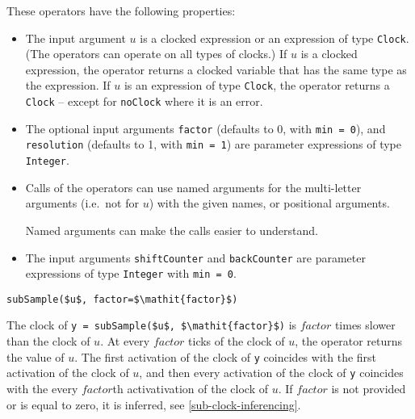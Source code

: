 These operators have the following properties:
\begin{itemize}
\item
  The input argument $u$ is a clocked expression or an expression of type \lstinline!Clock!.  (The operators can operate on all types of clocks.)  If $u$ is a clocked expression, the operator returns a clocked variable that has the same type as the expression.  If $u$ is an expression of type \lstinline!Clock!, the operator returns a \lstinline!Clock! -- except for \lstinline!noClock! where it is an error.
\item
  The optional input arguments \lstinline!factor! (defaults to 0, with \lstinline!min = 0!), and \lstinline!resolution! (defaults to 1, with \lstinline!min = 1!) are parameter expressions of type \lstinline!Integer!.
\item
  Calls of the operators can use named arguments for the multi-letter arguments (i.e.\ not for $u$) with the given names, or positional arguments.
\begin{nonnormative}
Named arguments can make the calls easier to understand.
\end{nonnormative}
\item
  The input arguments \lstinline!shiftCounter! and \lstinline!backCounter! are parameter expressions of type \lstinline!Integer! with \lstinline!min = 0!.
\end{itemize}

\begin{operatordefinition}[subSample]
\begin{synopsis}\begin{lstlisting}
subSample($u$, factor=$\mathit{factor}$)
\end{lstlisting}\end{synopsis}
\begin{semantics}
The clock of \lstinline!y = subSample($u$, $\mathit{factor}$)! is $\mathit{factor}$ times slower than the clock of $u$.
At every $\mathit{factor}$ ticks of the clock of $u$, the operator returns the value of $u$.
The first activation of the clock of \lstinline!y! coincides with the first activation of the clock of $u$, and then every activation of the clock of \lstinline!y! coincides with the every $\mathit{factor}$th activativation of the clock of $u$.
If $\mathit{factor}$ is not provided or is equal to zero, it is inferred, see \cref{sub-clock-inferencing}.
\end{semantics}
\end{operatordefinition}

